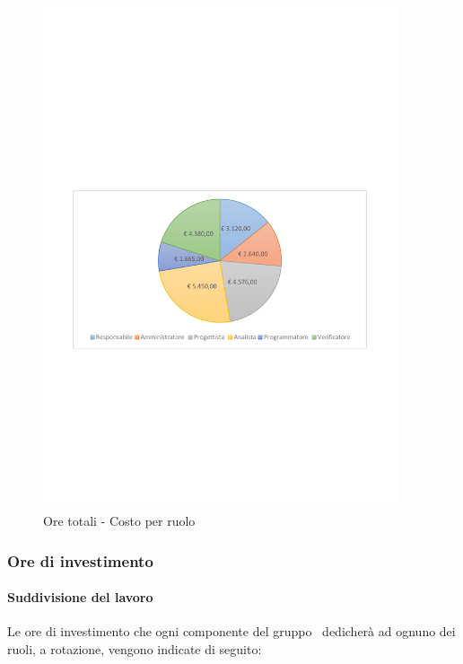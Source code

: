 \documentclass[../PianoProgetto.tex]{subfiles}
\begin{document}
	\begin{figure}[!h]
		\centering
		\includegraphics[width=0.93\textwidth , trim=2cm 9.5cm 2cm 11cm]{grafici/Riepilogo/Totali/costo}
			\caption{Ore totali - Costo per ruolo}
		\label{fig:CircleChart-totale_ore}
	\end{figure}
\vfill
\newpage
	
	\subsubsection{Ore di investimento}
				\paragraph{Suddivisione del lavoro}
					Le ore di investimento che ogni componente del gruppo \leaf\ dedicherà ad ognuno dei ruoli, a rotazione, vengono indicate di seguito:
	
\end{document}
